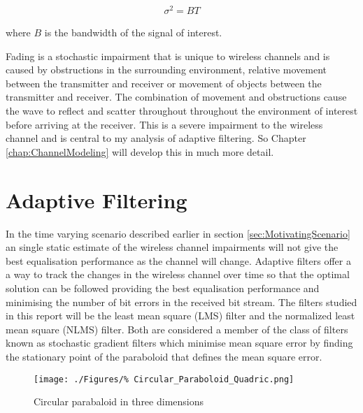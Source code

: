 \begin{align}
	\sigma^{2} = BT
\end{align}

where $B$ is the bandwidth of the %
signal of interest.

Fading is a stochastic impairment %
that is unique to wireless %
channels and is caused by obstructions %
in the surrounding environment, %
relative movement between the %
transmitter and receiver %
or movement of objects between %
the transmitter and receiver. The %
combination of movement and %
obstructions cause the wave to %
reflect and scatter throughout %
throughout the environment of %
interest before arriving %
at the receiver. This is a %
severe impairment to the wireless %
channel and is central to my %
analysis of adaptive filtering. So %
Chapter \ref{chap:ChannelModeling} %
will develop this in much more detail.

\section{Adaptive Filtering}

In the time varying scenario described earlier in %
section \ref{sec:MotivatingScenario} an single %
static estimate of the wireless channel impairments %
will not give the best equalisation performance as %
the channel will change. Adaptive filters offer a %
a way to track the changes in the wireless channel %
over time so that the optimal solution can be %
followed providing the best equalisation performance %
and minimising the number of bit errors in the received %
bit stream. The filters studied in this report will be %
the least mean square (LMS) filter and the %
normalized least mean square (NLMS) filter. Both %
are considered a member of the class of filters known %
as stochastic gradient filters which minimise mean square %
error by finding the stationary point of the paraboloid %
that defines the mean square error.
\begin{figure}[ht]
	\centering
	\texttt{[image: ./Figures/\%
Circular\_Paraboloid\_Quadric.png]}
	\caption{Circular parabaloid in three dimensions 
	\cite{Paraboloid12}}
\end{figure}

